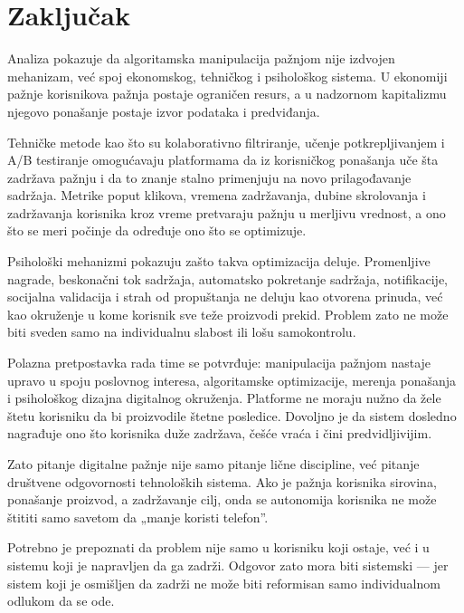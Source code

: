 \section{Zaključak}

Analiza pokazuje da algoritamska manipulacija pažnjom nije izdvojen mehanizam, već spoj ekonomskog, tehničkog i psihološkog sistema. U ekonomiji pažnje korisnikova pažnja postaje ograničen resurs, a u nadzornom kapitalizmu njegovo ponašanje postaje izvor podataka i predviđanja.

Tehničke metode kao što su kolaborativno filtriranje, učenje potkrepljivanjem i A/B testiranje omogućavaju platformama da iz korisničkog ponašanja uče šta zadržava pažnju i da to znanje stalno primenjuju na novo prilagođavanje sadržaja. Metrike poput klikova, vremena zadržavanja, dubine skrolovanja i zadržavanja korisnika kroz vreme pretvaraju pažnju u merljivu vrednost, a ono što se meri počinje da određuje ono što se optimizuje.

Psihološki mehanizmi pokazuju zašto takva optimizacija deluje. Promenljive nagrade, beskonačni tok sadržaja, automatsko pokretanje sadržaja, notifikacije, socijalna validacija i strah od propuštanja ne deluju kao otvorena prinuda, već kao okruženje u kome korisnik sve teže proizvodi prekid. Problem zato ne može biti sveden samo na individualnu slabost ili lošu samokontrolu.

Polazna pretpostavka rada time se potvrđuje: manipulacija pažnjom nastaje upravo u spoju poslovnog interesa, algoritamske optimizacije, merenja ponašanja i psihološkog dizajna digitalnog okruženja. Platforme ne moraju nužno da žele štetu korisniku da bi proizvodile štetne posledice. Dovoljno je da sistem dosledno nagrađuje ono što korisnika duže zadržava, češće vraća i čini predvidljivijim.

Zato pitanje digitalne pažnje nije samo pitanje lične discipline, već pitanje društvene odgovornosti tehnoloških sistema. Ako je pažnja korisnika sirovina, ponašanje proizvod, a zadržavanje cilj, onda se autonomija korisnika ne može štititi samo savetom da „manje koristi telefon”.

Potrebno je prepoznati da problem nije samo u korisniku koji ostaje, već i u sistemu koji je napravljen da ga zadrži. Odgovor zato mora biti sistemski — jer sistem koji je osmišljen da zadrži ne može biti reformisan samo individualnom odlukom da se ode.